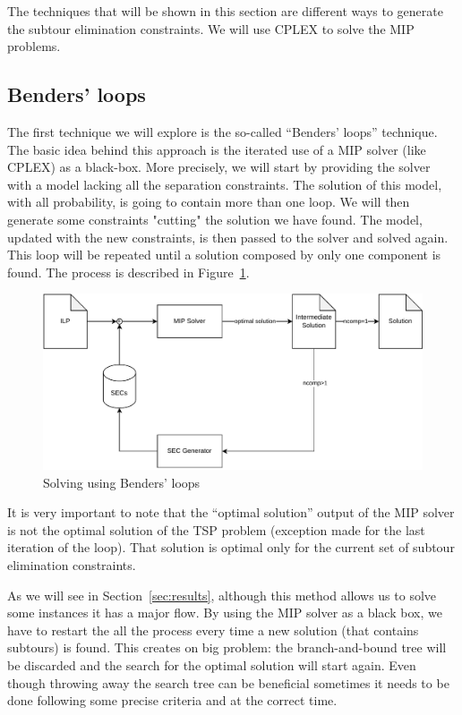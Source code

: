\documentclass{article}
\begin{document}
The techniques that will be shown in this section are different ways to generate
the subtour elimination constraints. We will use CPLEX to solve the MIP
problems.
\subsection{Benders' loops}
\label{ssec:benders}
The first technique we will explore is the so-called ``Benders' loops'' technique.
The basic idea behind this approach is the iterated use of a MIP solver (like CPLEX)
as a black-box. More precisely, we will start by providing the solver with
a model lacking all the separation constraints. The solution of this model,
with all probability, is going to contain more than one loop. We will then
generate some constraints "cutting" the solution we have found.
The model, updated with the new constraints, is then passed to the solver
and solved again. This loop will be repeated until a solution composed by
only one component is found.
The process is described in Figure~\ref{fig:benders}.

\begin{figure}[h]
        \caption{Solving using Benders' loops}
        \label{fig:benders}
        \centering
        \includegraphics[width=340pt]{assets/bendersloops.drawio.pdf}
\end{figure}

It is very important to note that the ``optimal solution'' output of the
MIP solver is not the optimal solution of the TSP problem (exception made
for the last iteration of the loop). That solution is optimal only for the
current set of subtour elimination constraints.

As we will see in Section~\ref{sec:results}, although this method allows us to
solve some instances it has a major flow. By using the MIP solver as a black
box, we have to restart the all the process every time a new solution (that
contains subtours) is found. This creates on big problem: the branch-and-bound
tree will be discarded and the search for the optimal solution will start again.
Even though throwing away the search tree can be beneficial sometimes %
it needs to be done following some precise criteria and at the correct time.
\end{document}
